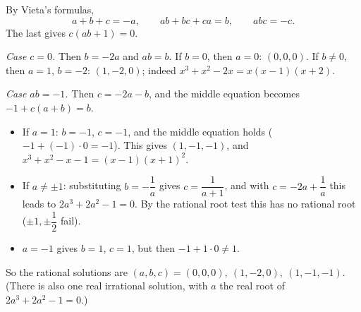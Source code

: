 By Vieta's formulas,
\[a+b+c=-a,\qquad ab+bc+ca=b,\qquad abc=-c.\]
The last gives $c(ab+1)=0$.

\emph{Case $c=0$.} Then $b=-2a$ and $ab=b$. If $b=0$, then $a=0$: $(0,0,0)$. If $b\ne0$, then $a=1$, $b=-2$: $(1,-2,0)$; indeed $x^3+x^2-2x=x(x-1)(x+2)$.

\emph{Case $ab=-1$.} Then $c=-2a-b$, and the middle equation becomes $-1+c(a+b)=b$.
\begin{itemize}
\item If $a=1$: $b=-1$, $c=-1$, and the middle equation holds ($-1+(-1)\cdot0=-1$). This gives $(1,-1,-1)$, and $x^3+x^2-x-1=(x-1)(x+1)^2$.
\item If $a\ne\pm1$: substituting $b=-\dfrac1a$ gives $c=\dfrac{1}{a+1}$, and with $c=-2a+\dfrac1a$ this leads to $2a^3+2a^2-1=0$. By the rational root test this has no rational root ($\pm1,\pm\dfrac12$ fail).
\item $a=-1$ gives $b=1$, $c=1$, but then $-1+1\cdot0\ne1$.
\end{itemize}
So the rational solutions are $\boxed{(a,b,c)=(0,0,0),\ (1,-2,0),\ (1,-1,-1)}$. (There is also one real irrational solution, with $a$ the real root of $2a^3+2a^2-1=0$.)
